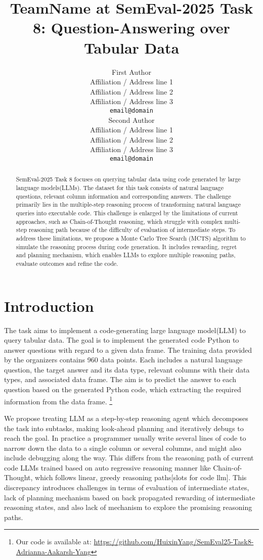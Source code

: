 \documentclass[11pt]{article}
\title{TeamName at SemEval-2025 Task 8: Question-Answering over Tabular Data}
\author{First Author \\
  Affiliation / Address line 1 \\
  Affiliation / Address line 2 \\
  Affiliation / Address line 3 \\
  \texttt{email@domain} \\\And
  Second Author \\
  Affiliation / Address line 1 \\
  Affiliation / Address line 2 \\
  Affiliation / Address line 3 \\
  \texttt{email@domain} \\}
\begin{document}
\maketitle

\begin{abstract}
SemEval-2025 Task 8 focuses on querying tabular data using code generated by 
large language models(LLMs). The dataset for this task consists of natural language questions, 
relevant column information and  corresponding answers. The challenge primarily lies in the multiple-step 
reasoning process of transforming natural language queries into executable code. This challenge is enlarged 
by the limitations of current approaches, such as Chain-of-Thought reasoning, which struggle with complex 
multi-step reasoning path because of the difficulty of evaluation of intermediate steps. To address these 
limitations, we propose a Monte Carlo Tree Search (MCTS) algorithm to simulate the reasoning process during 
code generation. It includes rewarding, regret and planning mechanism, which enables LLMs to explore multiple 
reasoning paths, evaluate outcomes and refine the code.
\end{abstract}

\section{Introduction}
The task aims to implement a code-generating large language model(LLM) to query tabular data. 
The goal is to implement the generated code Python to answer questions with regard to a given data frame. The training data 
provided by the organizers contains 960 data points. Each includes a natural language question, the target answer and 
its data type, relevant columns with their data types, and associated data frame. The aim is to predict the answer to each 
question based on the generated Python code, which extracting the required information from the data 
frame\citep{oses-grijalba-etal-2024-question}. 
\footnote{Our code is available at:  \url{https://github.com/HuixinYang/SemEval25-Task8-Adrianna-Aakarsh-Yang}} 

We propose treating LLM as a step-by-step reasoning agent which decomposes the 
task into subtasks, making look-ahead planning and iteratively debugs to reach the goal. 
In practice a programmer usually write several lines of code to narrow down the data to a 
single column or several columns, and might also include debugging along the way. This differs from the reasoning path of 
current code LLMs trained based on auto regressive reasoning manner like Chain-of-Thought, which follows linear, greedy reasoning paths[slots for code llm]. This discrepancy introduces challenges in terms of evaluation of intermediate states, lack of planning mechanism based on back propagated rewarding of intermediate reasoning states, and also lack of mechanism to explore the promising reasoning paths\citep{zhang2023planninglargelanguagemodels}. 
\end{document}
